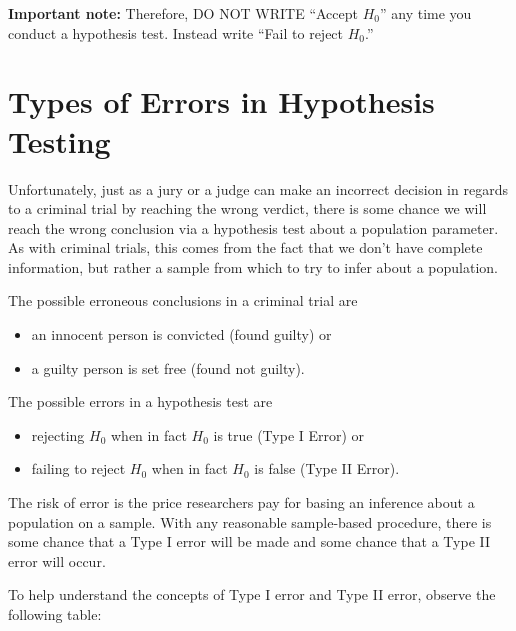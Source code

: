 \documentclass[]{tufte-book}
\providecommand{\tightlist}{%
  \setlength{\itemsep}{0pt}\setlength{\parskip}{0pt}}
\begin{document}
\textbf{Important note:} Therefore, DO NOT WRITE ``Accept \(H_0\)'' any
time you conduct a hypothesis test. Instead write ``Fail to reject
\(H_0\).''

\section{Types of Errors in Hypothesis
Testing}\label{types-of-errors-in-hypothesis-testing}

Unfortunately, just as a jury or a judge can make an incorrect decision
in regards to a criminal trial by reaching the wrong verdict, there is
some chance we will reach the wrong conclusion via a hypothesis test
about a population parameter. As with criminal trials, this comes from
the fact that we don't have complete information, but rather a sample
from which to try to infer about a population.

The possible erroneous conclusions in a criminal trial are

\begin{itemize}
\tightlist
\item
  an innocent person is convicted (found guilty) or
\item
  a guilty person is set free (found not guilty).
\end{itemize}

The possible errors in a hypothesis test are

\begin{itemize}
\tightlist
\item
  rejecting \(H_0\) when in fact \(H_0\) is true (Type I Error) or
\item
  failing to reject \(H_0\) when in fact \(H_0\) is false (Type II
  Error).
\end{itemize}

The risk of error is the price researchers pay for basing an inference
about a population on a sample. With any reasonable sample-based
procedure, there is some chance that a Type I error will be made and
some chance that a Type II error will occur.

To help understand the concepts of Type I error and Type II error,
observe the following table:
\end{document}
